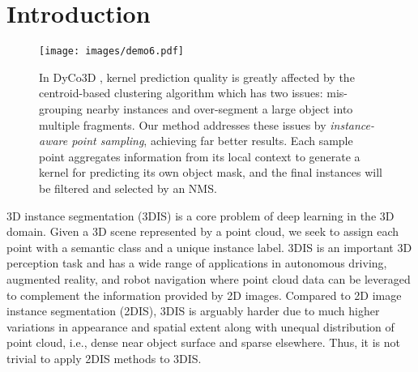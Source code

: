 \documentclass[10pt,twocolumn,letterpaper]{article}
\begin{document}
\vspace{-12pt}
\section{Introduction}
\label{sec:intro}

\begin{figure}[t]
  \centering
  \texttt{[image: images/demo6.pdf]}
  \vspace{-10pt}
   \caption{
   In DyCo3D \cite{he2021dyco3d}, kernel prediction quality is greatly affected by the centroid-based clustering algorithm which has two issues:
   \textbf{} mis-grouping nearby instances and \textbf{} over-segment a large object into multiple fragments. Our method addresses these issues by \emph{instance-aware point sampling}, achieving far better results. 
   Each sample point aggregates information from its local context to generate a kernel for predicting its own object mask, and the final instances will be filtered and selected by an NMS. 
   }
   \label{fig:demo}
   \vspace{-16pt}
\end{figure}

3D instance segmentation (3DIS) is a core problem of deep learning in the 3D domain. Given a 3D scene represented by a point cloud, we seek to assign each point with a semantic class and a unique instance label.
3DIS is an important 3D perception task and has a wide range of applications in autonomous driving, augmented reality, and robot navigation where point cloud data can be leveraged to complement the information provided by 2D images. Compared to 2D image instance segmentation (2DIS), 3DIS is arguably harder due to much higher variations in appearance and spatial extent along with unequal distribution of point cloud, i.e., dense near object surface and sparse elsewhere. Thus, it is not trivial to apply 2DIS methods to 3DIS. 

\end{document}
